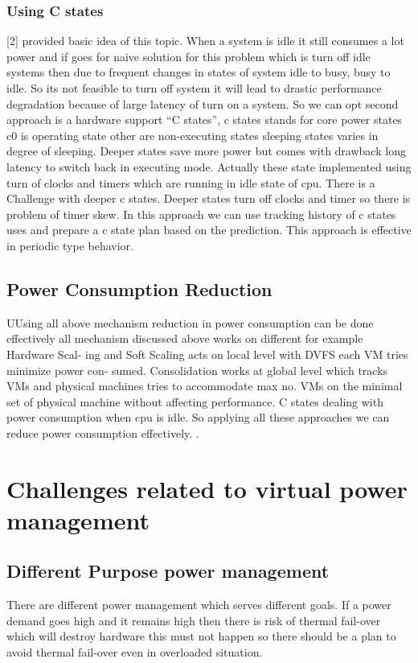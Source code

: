 \documentclass[seminar,twoside]{iitbreport}
\begin{document}
\subsubsection{Using C states}
[2] provided basic idea of this topic. When a system is idle it still consumes a lot power
and if goes for naive solution for this problem which is turn off idle systems then due to
frequent changes in states of system idle to busy, busy to idle. So its not feasible to turn off
system it will lead to drastic performance degradation because of large latency of turn on
a system. So we can opt second approach is a hardware support “C states”, c states stands
for core power states c0 is operating state other are non-executing states sleeping states
varies in degree of sleeping. Deeper states save more power but comes with drawback
long latency to switch back in executing mode. Actually these state implemented using
turn of clocks and timers which are running in idle state of cpu. There is a Challenge with
deeper c states. Deeper states turn off clocks and timer so there is problem of timer skew.
In this approach we can use tracking history of c states uses and prepare a c state plan
based on the prediction. This approach is effective in periodic type behavior\cite{cstates}.
\subsection{Power Consumption Reduction}
UUsing all above mechanism reduction in power consumption can be done effectively
all mechanism discussed above works on different for example Hardware Scal-
ing and Soft Scaling acts on local level with DVFS each VM tries minimize power con-
sumed. Consolidation works at global level which tracks VMs and physical machines
tries to accommodate max no. VMs on the minimal set of physical machine without
affecting performance. C states dealing with power consumption when cpu is idle. So
applying all these approaches we can reduce power consumption effectively.
.

\section{Challenges related to virtual power management}
\subsection{ Different Purpose power management}
There are different power management which serves different goals. If a power demand goes high and it remains high then
there is risk of thermal fail-over which will destroy hardware this must not happen so
there should be a plan to avoid thermal fail-over even in overloaded situation\cite{nostruggle}.
\end{document}
